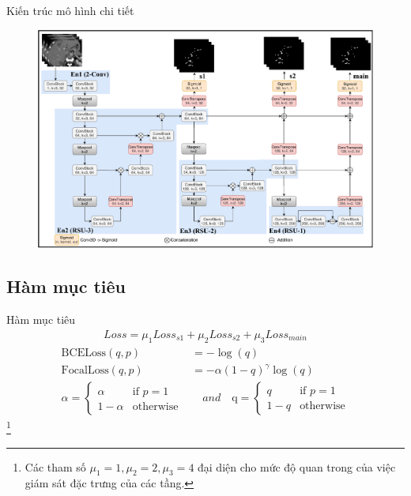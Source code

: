 \documentclass[
	10pt,                %
	aspectratio=169,     %
]{beamer}
\begin{document}
	\begin{frame}{Kiến trúc mô hình chi tiết}
		\vspace{-0.3cm}
		\begin{figure}[h!]
			\includegraphics[scale=0.37]{figures/arch/u2net3d_arch.pdf}
		\end{figure}
	\end{frame}%
	
\subsection{Hàm mục tiêu}
	\begin{frame}{Hàm mục tiêu}
	    \begin{align}
            Loss = \mu_{1}Loss_{s1} + \mu_{2}Loss_{s2} + \mu_{3}Loss_{main}
        \end{align}
        \begin{align}
            \mathrm{BCELoss}(q, p) &= -\log(q)\\
            \mathrm{FocalLoss}(q, p) &= -\alpha(1-q)^\gamma \log(q)\\
            \nonumber
            \alpha = \begin{cases} 
                            \alpha & \text{if } p = 1 \\
                            1-\alpha & \text{otherwise}
                        \end{cases}
            &\quad and \quad
            \mathrm{q} = \begin{cases} 
                    q & \text{if } p = 1 \\
                    1-q & \text{otherwise}
                  \end{cases}
        \end{align}
        \vspace{-8mm}\let\thefootnote\relax\footnote{\hspace{-3mm}\tiny *Các tham số $\mu_1=1, \mu_2=2, \mu_3=4$ đại diện cho mức độ quan trong của việc giám sát đặc trưng của các tầng.}
	\end{frame}
\end{document}

